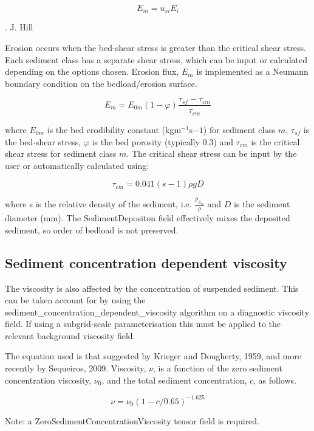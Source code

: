 \begin{equation}\label{eq:dimensionalised_entrainment}
E_{m} = u_{si}E_i
\end{equation}

. J. Hill

Erosion occurs when the bed-shear stress is greater than the critical shear
stress. Each sediment class has a separate shear stress, which can be input or calculated
depending on the options chosen. Erosion flux, $E_m$ is implemented as a Neumann boundary
condition on the bedload/erosion surface.

\begin{equation}\label{eq:sediment_erosion_rate}
E_m = E_{0m}\left(1-\varphi\right)\frac{\tau_{sf} - \tau_{cm}}{\tau_{cm}}
\end{equation}

\noindent
where $E_{0m}$ is the bed erodibility constant (kgm$^{-1}$s${-1}$) for sediment class $m$,
$\tau_{sf}$ is the bed-shear stress, $\varphi$ is the bed porosity (typically 0.3)
and $\tau_{cm}$ is the critical shear stress
for sediment class $m$. The critical shear stress can be input by the user or 
automatically calculated using:

\begin{equation}\label{eq:critical_shear_stress}
\tau_{cm} = 0.041\left(s-1\right)\rho gD
\end{equation}

\noindent
where s is the relative density of the sediment, i.e. $\frac{\rho_{S_{m}}}{\rho}$ and $D$ is the
sediment diameter (mm). The SedimentDepositon field effectively mixes the deposited sediment, so
order of bedload is not preserved.

\subsection{Sediment concentration dependent viscosity}

The viscosity is also affected by the concentration of suspended sediment. This can be taken account for by
using the sediment\_concentration\_dependent\_viscosity algorithm on a diagnostic viscosity field. If using 
a subgrid-scale parameterisation this must be applied to the relevant background viscosity field.

The equation used is that suggested by Krieger and Dougherty, 1959, and more recently by Sequeiros, 2009. 
Viscosity, $\nu$, is a function of the zero sediment concentration viscosity, $\nu_0$, and the total sediment
concentration, $c$, as follows.

\begin{equation}\label{eq:sediment_concentration_dependent_viscosity}
\nu = \nu_{0}(1-c/0.65)^{-1.625}
\end{equation}

Note: a ZeroSedimentConcentrationViscosity tensor field is required.


